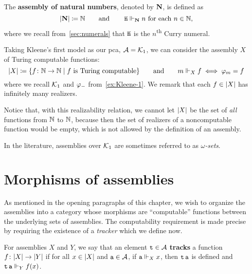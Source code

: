 \begin{example}\label{ex:NatAsm}
  The \textbf{assembly of natural numbers}, denoted by \(\mathbf N\), is defined as
  \[
    \lvert\mathbf N\rvert \coloneqq \mathbb N
    \quad\quad\text{and}\quad\quad
    \operatorname{\overline{\mathtt{n}}} \Vdash_\mathbf N n \text{ for each \(n \in \mathbb N\)},
  \]
  where we recall from~\cref{sec:numerals} that \(\operatorname{\overline{\mathtt{n}}}\) is the
  \(n\)\textsuperscript{th} Curry numeral.
\end{example}

\begin{example}
  Taking Kleene's first model as our pca, \(\mathcal A = \mathcal{K}_1\), we can consider the
  assembly \(X\) of Turing computable functions:
  \[
    \lvert X\rvert \coloneqq \{f \colon \mathbb N \to \mathbb N \mid f \text{ is Turing computable}\}
    \quad\quad\text{and}\quad\quad
    m \Vdash_X f \iff \varphi_{m} = f
  \]
  where we recall \(\mathcal{K}_1\) and \(\varphi_{-}\) from~\cref{ex:Kleene-1}.
  We remark that each \(f \in \lvert X\rvert\) has infinitely many realizers.

  Notice that, with this realizability relation, we cannot let \(\lvert X\rvert\)
  be the set of \emph{all} functions from \(\mathbb N\) to \(\mathbb N\), because then the
  set of realizers of a noncomputable function would be empty, which is not
  allowed by the definition of an assembly.
\end{example}

In the literature, assemblies over \(\mathcal{K}_1\) are sometimes referred
to as \emph{\(\omega\)-sets}.

\section{Morphisms of assemblies}

As mentioned in the opening paragraphs of this chapter, we wish to organize the
assemblies into a category whose morphisms are ``computable'' functions between
the underlying sets of assemblies.
%
The computability requirement is made precise by requiring the existence of a
\emph{tracker} which we define now.

\begin{definition}[Track]
  For assemblies \(X\) and \(Y\), we say that an element \(\operatorname{\mathtt{t}} \in \mathcal A\)
  \textbf{tracks} a function \(f \colon \lvert X\rvert \to \lvert Y\rvert\) if for all
  \(x \in \lvert X\rvert\) and \(\operatorname{\mathtt{a}} \in \mathcal A\), if \(\operatorname{\mathtt{a}} \Vdash_X x\), then
  \(\operatorname{\mathtt{t}}\operatorname{\mathtt{a}}\) is defined and \(\operatorname{\mathtt{t}}\operatorname{\mathtt{a}} \Vdash_Y f(x)\).
\end{definition}

